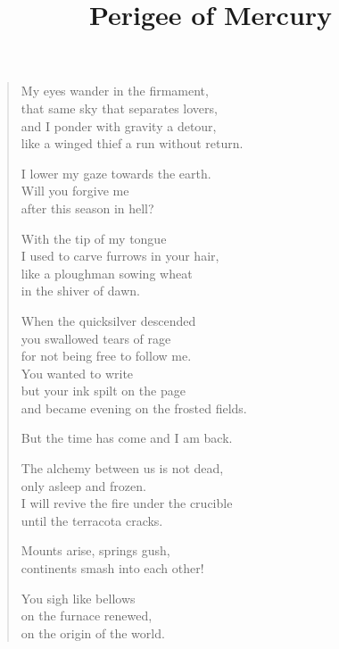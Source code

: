\documentclass[twocolumn,11pt]{article}
\title{Perigee of Mercury}
\author{}
\date{}
\begin{document}
\maketitle

\thispagestyle{empty}



\bigskip

\begin{verse}%
  My eyes wander in the firmament, \\
  that same sky that separates lovers, \\
  and I ponder with gravity a detour, \\
  like a winged thief a run without return.

  I lower my gaze towards the earth. \\
  Will you forgive me \\
  after this season in hell?

  With the tip of my tongue \\
  I used to carve furrows in your hair, \\
  like a ploughman sowing wheat \\
  in the shiver of dawn.

  When the quicksilver descended \\
  you swallowed tears of rage \\
  for not being free to follow me. \\
  You wanted to write \\
  but your ink spilt on the page \\
  and became evening on the frosted fields.

  But the time has come and I am back.

  The alchemy between us is not dead, \\
  only asleep and frozen. \\
  I will revive the fire under the crucible \\
  until the terracota cracks.

  \newpage

  Mounts arise, springs gush, \\
  continents smash into each other!

  You sigh like bellows \\
  on the furnace renewed, \\
  on the origin of the world.


\end{verse}
\end{document}
